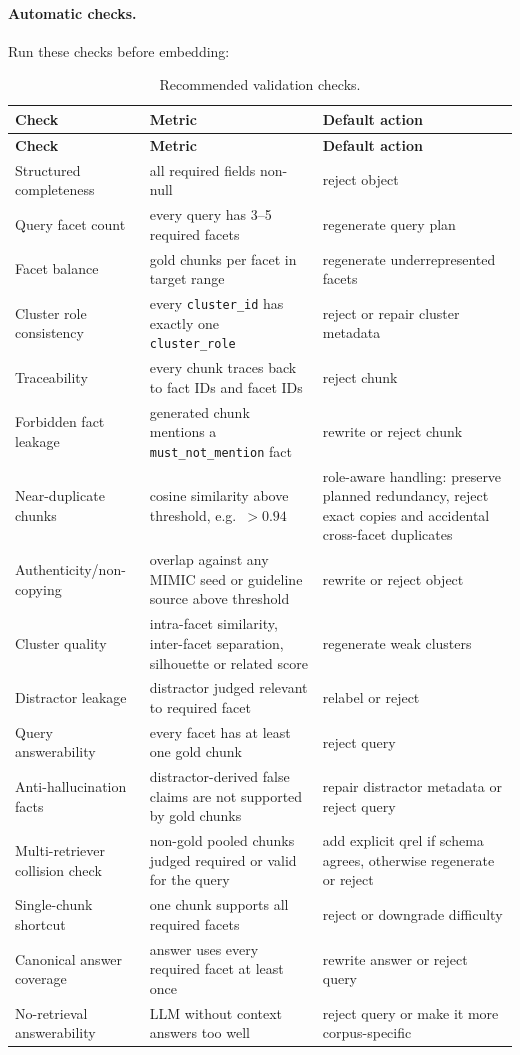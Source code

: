 \documentclass[11pt,a4paper]{article}
\newcommand{\field}[1]{\texttt{#1}}
\begin{document}
\paragraph{Automatic checks.}
Run these checks before embedding:

\begin{longtable}{p{4cm}p{6.1cm}p{4.7cm}}
	\caption{Recommended validation checks.}\\
	\toprule
	\textbf{Check} & \textbf{Metric} & \textbf{Default action}\\
	\midrule
	\endfirsthead
	\toprule
	\textbf{Check} & \textbf{Metric} & \textbf{Default action}\\
	\midrule
	\endhead
	\bottomrule
	\endfoot
	Structured completeness & all required fields non-null & reject object\\
	Query facet count & every query has 3--5 required facets & regenerate query plan\\
	Facet balance & gold chunks per facet in target range & regenerate underrepresented facets\\
	Cluster role consistency & every \field{cluster\_id} has exactly one \field{cluster\_role} & reject or repair cluster metadata\\
	Traceability & every chunk traces back to fact IDs and facet IDs & reject chunk\\
	Forbidden fact leakage & generated chunk mentions a \field{must\_not\_mention} fact & rewrite or reject chunk\\
	Near-duplicate chunks & cosine similarity above threshold, e.g.\ $>0.94$ & role-aware handling: preserve planned redundancy, reject exact copies and accidental cross-facet duplicates\\
	Authenticity/non-copying & overlap against any MIMIC seed or guideline source above threshold & rewrite or reject object\\
	Cluster quality & intra-facet similarity, inter-facet separation, silhouette or related score & regenerate weak clusters\\
	Distractor leakage & distractor judged relevant to required facet & relabel or reject\\
	Query answerability & every facet has at least one gold chunk & reject query\\
	Anti-hallucination facts & distractor-derived false claims are not supported by gold chunks & repair distractor metadata or reject query\\
	Multi-retriever collision check & non-gold pooled chunks judged required or valid for the query & add explicit qrel if schema agrees, otherwise regenerate or reject\\
	Single-chunk shortcut & one chunk supports all required facets & reject or downgrade difficulty\\
	Canonical answer coverage & answer uses every required facet at least once & rewrite answer or reject query\\
	No-retrieval answerability & LLM without context answers too well & reject query or make it more corpus-specific\\
\end{longtable}
\end{document}
